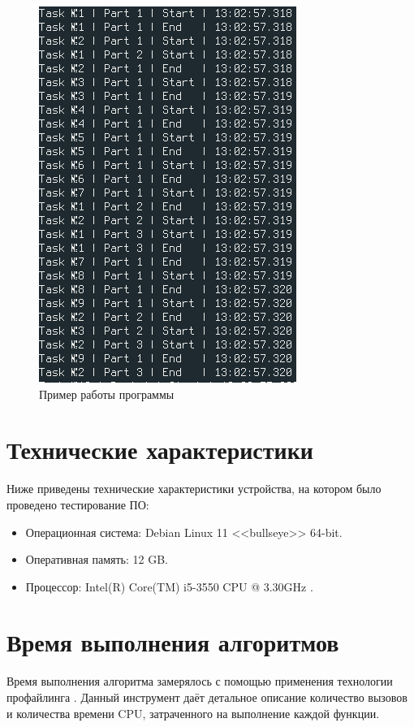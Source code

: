\documentclass[12pt]{report}
\begin{document}
\begin{figure}[h]
	\centering
	\includegraphics[scale=0.8]{prog_ex.png}
	\caption{Пример работы программы}
	\label{fig:mpr}
\end{figure}

\section{Технические характеристики}

Ниже приведены технические характеристики устройства, на котором было проведено тестирование ПО:

\begin{itemize}
	\item Операционная система: Debian \cite{debian} Linux \cite{linux} 11 <<bullseye>> 64-bit.
	\item Оперативная память: 12 GB.
	\item Процессор: Intel(R) Core(TM) i5-3550 CPU @ 3.30GHz
\cite{i5}.

\end{itemize}

\section{Время выполнения алгоритмов}

Время выполнения алгоритма замерялось с помощью применения технологии профайлинга \cite{profiling}. Данный инструмент даёт детальное описание количество вызовов и количества времени CPU, затраченного на выполнение каждой функции.
\end{document}
